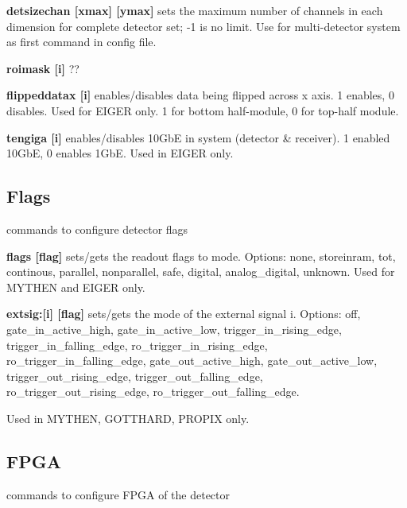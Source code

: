 \begin{DoxyItemize}
\item {\bfseries detsizechan \mbox{[}xmax\mbox{]} \mbox{[}ymax\mbox{]}} sets the maximum number of channels in each dimension for complete detector set; -\/1 is no limit. Use for multi-\/detector system as first command in config file.
\end{DoxyItemize}


\begin{DoxyItemize}
\item {\bfseries roimask \mbox{[}i\mbox{]}} ??
\end{DoxyItemize}


\begin{DoxyItemize}
\item {\bfseries flippeddatax \mbox{[}i\mbox{]}} enables/disables data being flipped across x axis. 1 enables, 0 disables. Used for EIGER only. 1 for bottom half-\/module, 0 for top-\/half module.
\end{DoxyItemize}


\begin{DoxyItemize}
\item {\bfseries tengiga \mbox{[}i\mbox{]}} enables/disables 10GbE in system (detector \& receiver). 1 enabled 10GbE, 0 enables 1GbE. Used in EIGER only.
\end{DoxyItemize}\hypertarget{config_configflags}{}\subsection{Flags}\label{config_configflags}
commands to configure detector flags


\begin{DoxyItemize}
\item {\bfseries flags \mbox{[}flag\mbox{]}} sets/gets the readout flags to mode. Options: none, storeinram, tot, continous, parallel, nonparallel, safe, digital, analog\_\-digital, unknown. Used for MYTHEN and EIGER only.
\end{DoxyItemize}


\begin{DoxyItemize}
\item {\bfseries extsig:\mbox{[}i\mbox{]} \mbox{[}flag\mbox{]}} sets/gets the mode of the external signal i. Options: {\ttfamily off}, {\ttfamily gate\_\-in\_\-active\_\-high}, {\ttfamily gate\_\-in\_\-active\_\-low}, {\ttfamily trigger\_\-in\_\-rising\_\-edge}, {\ttfamily trigger\_\-in\_\-falling\_\-edge}, {\ttfamily ro\_\-trigger\_\-in\_\-rising\_\-edge}, {\ttfamily ro\_\-trigger\_\-in\_\-falling\_\-edge}, {\ttfamily gate\_\-out\_\-active\_\-high}, {\ttfamily gate\_\-out\_\-active\_\-low}, {\ttfamily trigger\_\-out\_\-rising\_\-edge}, {\ttfamily trigger\_\-out\_\-falling\_\-edge}, {\ttfamily ro\_\-trigger\_\-out\_\-rising\_\-edge}, {\ttfamily ro\_\-trigger\_\-out\_\-falling\_\-edge}. \par
 Used in MYTHEN, GOTTHARD, PROPIX only.
\end{DoxyItemize}\hypertarget{config_configfpga}{}\subsection{FPGA}\label{config_configfpga}
commands to configure FPGA of the detector


